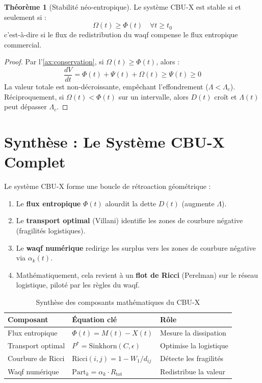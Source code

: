 \documentclass[11pt,a4paper]{article}
\theoremstyle{definition}
\newtheorem{theorem}{Théorème}[section]
\theoremstyle{remark}
\begin{document}
\begin{theorem}[Stabilité néo-entropique]
\label{th:stabilite}
Le système CBU-X est stable si et seulement si :
\begin{equation}
    \Omega(t) \geq \Phi(t) \quad \forall t \geq t_0
\end{equation}
c'est-à-dire si le flux de redistribution du waqf compense le flux entropique commercial.
\end{theorem}

\begin{proof}
Par l'\cref{ax:conservation}, si $\Omega(t) \geq \Phi(t)$, alors :
\begin{equation}
    \frac{dV}{dt} = \Phi(t) + \Psi(t) + \Omega(t) \geq \Psi(t) \geq 0
\end{equation}
La valeur totale est non-décroissante, empêchant l'effondrement ($\Lambda < \Lambda_c$). Réciproquement, si $\Omega(t) < \Phi(t)$ sur un intervalle, alors $D(t)$ croît et $\Lambda(t)$ peut dépasser $\Lambda_c$.
\end{proof}

\section{Synthèse : Le Système CBU-X Complet}
\label{sec:synthese}

Le système CBU-X forme une boucle de rétroaction géométrique :

\begin{enumerate}
    \item Le \textbf{flux entropique} $\Phi(t)$ alourdit la dette $D(t)$ (augmente $\Lambda$).
    \item Le \textbf{transport optimal} (Villani) identifie les zones de courbure négative (fragilités logistiques).
    \item Le \textbf{waqf numérique} redirige les surplus vers les zones de courbure négative via $\alpha_k(t)$.
    \item Mathématiquement, cela revient à un \textbf{flot de Ricci} (Perelman) sur le réseau logistique, piloté par les règles du waqf.
\end{enumerate}

\begin{table}[h]
\centering
\caption{Synthèse des composants mathématiques du CBU-X}
\label{tab:synthese}
\begin{tabular}{@{}lll@{}}
\toprule
\textbf{Composant} & \textbf{Équation clé} & \textbf{Rôle} \\
\midrule
Flux entropique & $\Phi(t) = M(t) - X(t)$ & Mesure la dissipation \\
Transport optimal & $P^* = \text{Sinkhorn}(C, \epsilon)$ & Optimise la logistique \\
Courbure de Ricci & $\text{Ricci}(i,j) = 1 - W_1/d_{ij}$ & Détecte les fragilités \\
Waqf numérique & $\text{Part}_k = \alpha_k \cdot R_{\text{tot}}$ & Redistribue la valeur \\
\bottomrule
\end{tabular}
\end{table}
\end{document}
